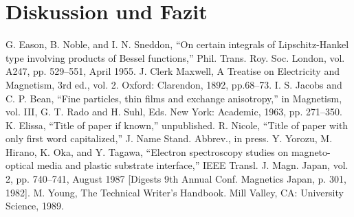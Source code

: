 \documentclass[conference]{IEEEtran}
\begin{document}
\section{Diskussion und Fazit}




\begin{thebibliography}{00}
 G. Eason, B. Noble, and I. N. Sneddon, ``On certain integrals of Lipschitz-Hankel type involving products of Bessel functions,'' Phil. Trans. Roy. Soc. London, vol. A247, pp. 529--551, April 1955.
 J. Clerk Maxwell, A Treatise on Electricity and Magnetism, 3rd ed., vol. 2. Oxford: Clarendon, 1892, pp.68--73.
 I. S. Jacobs and C. P. Bean, ``Fine particles, thin films and exchange anisotropy,'' in Magnetism, vol. III, G. T. Rado and H. Suhl, Eds. New York: Academic, 1963, pp. 271--350.
 K. Elissa, ``Title of paper if known,'' unpublished.
 R. Nicole, ``Title of paper with only first word capitalized,'' J. Name Stand. Abbrev., in press.
 Y. Yorozu, M. Hirano, K. Oka, and Y. Tagawa, ``Electron spectroscopy studies on magneto-optical media and plastic substrate interface,'' IEEE Transl. J. Magn. Japan, vol. 2, pp. 740--741, August 1987 [Digests 9th Annual Conf. Magnetics Japan, p. 301, 1982].
 M. Young, The Technical Writer's Handbook. Mill Valley, CA: University Science, 1989.
\end{thebibliography}
\vspace{12pt}
\end{document}
